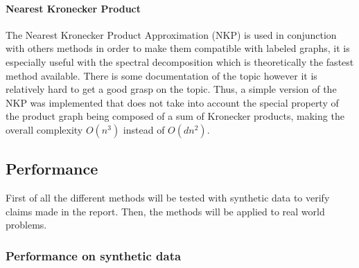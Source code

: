 \documentclass{article}
\theoremstyle{definition}
\begin{document}
\paragraph{Nearest Kronecker Product}
The Nearest Kronecker Product Approximation (NKP)\cite{van1993approximation} is used in conjunction with others methods in order to make them compatible with labeled graphs, it is especially useful with the spectral decomposition which is theoretically the fastest method available. There is some documentation of the topic however it is relatively hard to get a good grasp on the topic. Thus, a simple version of the NKP was implemented that does not take into account the special property of the product graph being composed of a sum of Kronecker products, making the overall complexity $O(n^3)$ instead of $O(dn^2)$.
	

\subsection{Performance}
First of all the different methods will be tested with synthetic data to verify claims made in the report. Then, the methods will be applied to real world problems. 
\subsubsection{Performance on synthetic data}
\end{document}
